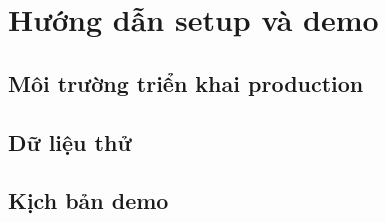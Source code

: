 \chapter{Hướng dẫn setup và demo}

\section{Môi trường triển khai production}

\section{Dữ liệu thử}

\section{Kịch bản demo}
